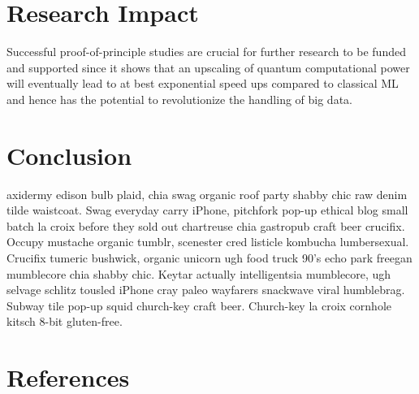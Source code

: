 \documentclass[a4paper]{article}
\newcommand*{\0}{$\ket{0}$}
\newcommand*{\1}{$\ket{1}$}
\begin{document}
\section{Research Impact}
\label{sec:research impact}
Successful proof-of-principle studies are crucial for further research to be funded and supported since it shows that an upscaling of quantum computational power will eventually lead to at best exponential speed ups compared to classical ML and hence has the potential to revolutionize the handling of big data.

\section{Conclusion}
\label{sec:conclusion}
axidermy edison bulb plaid, chia swag organic roof party shabby chic raw denim tilde waistcoat. Swag everyday carry iPhone, pitchfork pop-up ethical blog small batch la croix before they sold out chartreuse chia gastropub craft beer crucifix. Occupy mustache organic tumblr, scenester cred listicle kombucha lumbersexual. Crucifix tumeric bushwick, organic unicorn ugh food truck 90's echo park freegan mumblecore chia shabby chic. Keytar actually intelligentsia mumblecore, ugh selvage schlitz tousled iPhone cray paleo wayfarers snackwave viral humblebrag. Subway tile pop-up squid church-key craft beer. Church-key la croix cornhole kitsch 8-bit gluten-free.

\newpage
\section{References}
\begingroup
\renewcommand{\section}[2]{}%


\endgroup


\end{document}
